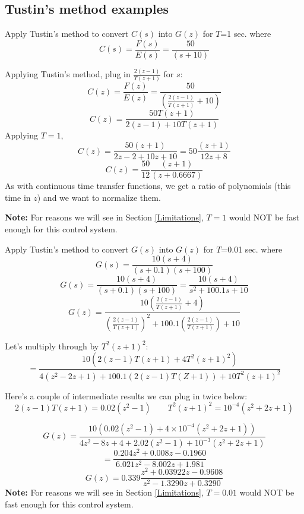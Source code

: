 \subsection{Tustin's method examples}

\begin{Example}	%

Apply Tustin's method to convert $C(s)$ into $G(z)$ for $T$=1 sec. where
\[
C(s) = \frac{F(s)}{E(s)} = \frac{50}{(s+10)}
\]



Applying Tustin's method, plug in $\frac{2(z-1)}{T(z+1)}$ for $s$:
\[
C(z) = \frac{F(z)}{E(z)} = \frac{50}{(\frac{2(z-1)}{T(z+1)}+10)}
\]
\[
C(z) = \frac{50T(z+1)}              {2(z-1)+10T(z+1)}
\]
Applying $T=1$,
\[
C(z) = \frac{50(z+1)}{2z-2+10z+10} = 50\frac{(z+1)}{12z+8}
\]
\[
C(z)  = \frac{50}{12}\frac{(z+1)}{(z+0.6667)}
\]
As with continuous time transfer functions, we get a ratio of polynomials (this time in $z$) and we want to normalize them.

{\bf Note:} For reasons we will see in Section \ref{Limitations}, $T=1$ would NOT be fast enough for this control system.
\end{Example}	%



\begin{Example}
Apply Tustin's method to convert $G(s)$ into $G(z)$ for $T$=0.01 sec. where
\[
G(s) = \frac{10(s+4)}{(s+0.1)(s+100)}
\]
\[
G(s) = \frac{10(s+4)}{(s+0.1)(s+100)} = \frac{10(s+4)}{s^2+100.1s+10}
\]
\[
G(z) = \frac{10 (\frac{2(z-1)}{T(z+1)} + 4) }   {(\frac {2(z-1)} {T(z+1)})^2+100.1(\frac{2(z-1)}{T(z+1)}) + 10}
\]

 Let's multiply through by $T^2(z+1)^2$:	%
\[
= \frac{10(2(z-1)T(z+1) + 4T^2(z+1)^2)}    {4(z^2-2z+1)+100.1(2(z-1)T(Z+1))+10T^2(z+1)^2}
\]

Here's a couple of intermediate results we can plug in twice below:	%
\[
2(z-1)T(z+1) = 0.02(z^2-1)  \qquad   T^2(z+1)^2 = 10^{-4}(z^2+2z+1)
\]

\[
G(z) = \frac   {10(0.02(z^2-1) + 4\times10^{-4}(z^2+2z+1))}          {4z^2-8z+4+2.02(z^2-1)+10^{-3}(z^2+2z+1)}
\]
\[
= \frac   {0.204z^2+0.008z-0.1960}        {6.021z^2-8.002z+1.981}
\]
\[
G(z) = 0.339 \frac   {z^2+0.03922z -0.9608}      {z^2-1.3290z+0.3290}
\]
{\bf Note:} For reasons we will see in Section \ref{Limitations}, $T=0.01$ would NOT be fast enough for this control system.
\end{Example}	%



